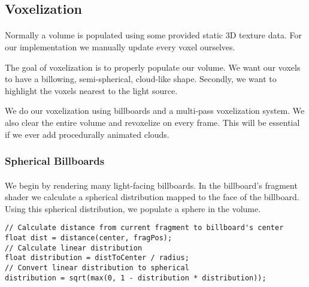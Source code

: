 \subsection{Voxelization}\paragraph{}
Normally a volume is populated using some provided static 3D texture data.  For our implementation we manually update every voxel ourselves. 

The goal of voxelization is to properly populate our volume. We want our voxels to have a billowing, semi-spherical, cloud-like shape. Secondly, we want to highlight the voxels nearest to the light source. 

We do our voxelization using billboards and a multi-pass voxelization system. We also clear the entire volume and revoxelize on every frame. This will be essential if we ever add procedurally animated clouds. 

\subsubsection{Spherical Billboards}\paragraph{}
We begin by rendering many light-facing billboards. In the billboard's fragment shader we calculate a spherical distribution mapped to the face of the billboard. Using this spherical distribution, we populate a sphere in the volume. 

\begin{lstlisting}[caption={first\_voxelize.glsl, 42}]
// Calculate distance from current fragment to billboard's center
float dist = distance(center, fragPos);
// Calculate linear distribution
float distribution = distToCenter / radius;
// Convert linear distribution to spherical
distribution = sqrt(max(0, 1 - distribution * distribution));
\end{lstlisting}\paragraph{}


\newpage
